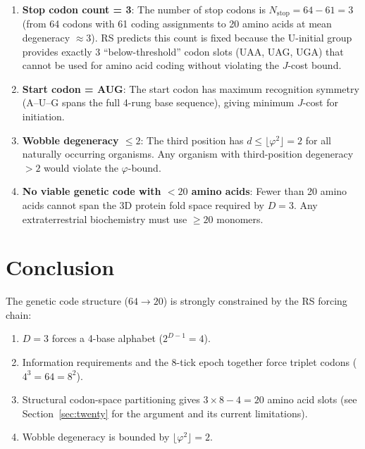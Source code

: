 \documentclass[12pt,a4paper]{article}
\theoremstyle{definition}
\theoremstyle{remark}
\begin{document}
\begin{enumerate}
  \item \textbf{Stop codon count = 3}: The number of stop codons is
  $N_{\mathrm{stop}} = 64 - 61 = 3$ (from 64 codons with 61 coding
  assignments to 20 amino acids at mean degeneracy $\approx 3$).
  RS predicts this count is fixed because the U-initial group provides
  exactly 3 ``below-threshold'' codon slots (UAA, UAG, UGA) that
  cannot be used for amino acid coding without violating the $J$-cost bound.

  \item \textbf{Start codon = AUG}: The start codon has maximum
  recognition symmetry (A--U--G spans the full 4-rung base sequence),
  giving minimum $J$-cost for initiation.

  \item \textbf{Wobble degeneracy $\leq 2$}: The third position has
  $d \leq \lfloor\varphi^2\rfloor = 2$ for all naturally occurring
  organisms.  Any organism with third-position degeneracy $> 2$ would
  violate the $\varphi$-bound.

  \item \textbf{No viable genetic code with $< 20$ amino acids}: Fewer
  than 20 amino acids cannot span the 3D protein fold space required by
  $D = 3$.  Any extraterrestrial biochemistry must use $\geq 20$
  monomers.
\end{enumerate}

\section{Conclusion}
\label{sec:conclusion}

The genetic code structure ($64 \to 20$) is strongly constrained by the
RS forcing chain:
\begin{enumerate}
  \item $D = 3$ forces a 4-base alphabet ($2^{D-1} = 4$).
  \item Information requirements and the 8-tick epoch together force
  triplet codons ($4^3 = 64 = 8^2$).
  \item Structural codon-space partitioning gives $3 \times 8 - 4 = 20$
  amino acid slots (see Section~\ref{sec:twenty} for the argument and
  its current limitations).
  \item Wobble degeneracy is bounded by
  $\lfloor\varphi^2\rfloor = 2$.
\end{enumerate}
\end{document}
